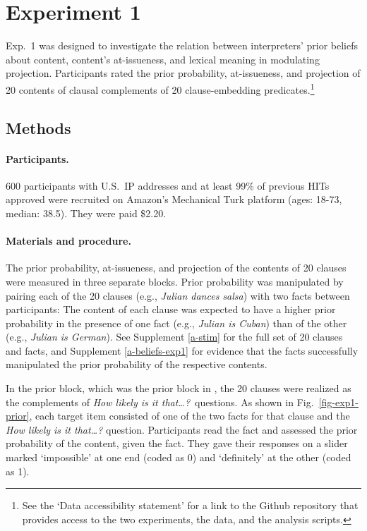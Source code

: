 \documentclass[11pt,fleqn]{article}
\newcommand{\6}{\mbox{$[\hspace*{-.6mm}[$}}
\newcommand{\9}{\mbox{$]\hspace*{-.6mm}]$}}
\begin{document}
\section{Experiment 1}\label{s2}

Exp.~1 was designed to investigate the relation between interpreters' prior beliefs about content, content's at-issueness, and lexical meaning in modulating projection. Participants rated the prior probability, at-issueness, and projection of 20 contents of clausal complements of 20 clause-embedding predicates.\footnote{See the `Data accessibility statement' for a link to the Github repository that provides access to the two experiments, the data, and the analysis scripts.}

\subsection{Methods} 
 
\paragraph{Participants.} 600 participants with U.S.\ IP addresses and at least 99\% of previous HITs approved were recruited on Amazon's Mechanical Turk platform (ages: 18-73, median: 38.5). They were paid \$2.20.

\paragraph{Materials and procedure.} The prior probability, at-issueness, and projection of the contents of 20 clauses were measured in three separate blocks. Prior probability was manipulated by pairing each of the 20 clauses (e.g., \emph{Julian dances salsa})  with two facts between participants: The content of each clause was expected to have a higher prior probability in the presence of one fact (e.g., \emph{Julian is Cuban}) than of the other (e.g., \emph{Julian is German}). See Supplement \ref{a-stim} for the full set of 20 clauses and facts, and Supplement \ref{a-beliefs-exp1} for evidence that the facts successfully manipulated the prior probability of the respective contents.

In the prior block, which was the prior block in \citealt{degen-tonhauser-openmind}, the 20 clauses were realized as the complements of {\em How likely is it that\ldots?}~questions. As shown in Fig.~\ref{fig-exp1-prior}, each target item consisted of one of the two facts for that clause and the {\em How likely is it that\ldots?} question. Participants read the fact and assessed the prior probability of the content, given the fact. They gave their responses on a slider marked `impossible' at one end (coded as 0) and `definitely' at the other (coded as 1). 
\end{document}
